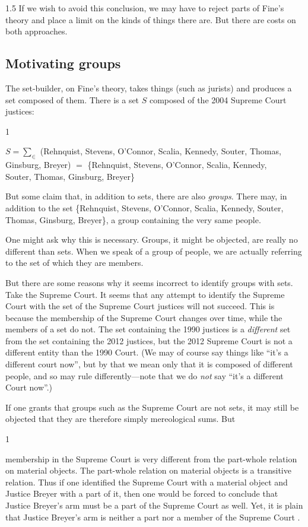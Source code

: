 \documentclass[11pt]{article}
\newenvironment{squote}{%
\begin{spacing}{1}
\begin{list}{}{%
\setlength{\labelwidth}{0pt}%
\rightmargin\leftmargin%
}
\item\relax
}{%
\end{list}%
\end{spacing}
}
\begin{document}
\begin{spacing}{1.5}
If we wish to avoid this conclusion, we may have to reject parts of
Fine's theory and place a limit on the kinds of things there are.  But
there are costs on both approaches.

\subsection{Motivating groups}
The set-builder, on Fine's theory, takes things (such as jurists) and
produces a set composed of them.  There is a set $S$ composed of the
2004 Supreme Court justices:

\begin{squote}
$S = \sum _{\in}$ (Rehnquist, Stevens, O'Connor, Scalia, Kennedy,
  Souter, Thomas, \\ Ginsburg, Breyer) $ = $ \{Rehnquist, Stevens,
  O'Connor, Scalia, Kennedy, \\ Souter, Thomas, Ginsburg, Breyer\}
\end{squote}

But some claim that, in addition to sets, there are also {\em groups}.
There may, in addition to the set \{Rehnquist, Stevens, O'Connor,
Scalia, Kennedy, Souter, Thomas, Ginsburg, Breyer\}, a group
containing the very same people.

One might ask why this is necessary.  Groups, it might be objected,
are really no different than sets.  When we speak of a group of
people, we are actually referring to the set of which they are
members.

But there are some reasons why it seems incorrect to identify groups
with sets.  Take the Supreme Court.  It seems that any attempt to
identify the Supreme Court with the set of the Supreme Court justices
will not succeed.  This is because the membership of the Supreme Court
changes over time, while the members of a set do not.  The set
containing the 1990 justices is a {\em different} set from the set
containing the 2012 justices, but the 2012 Supreme Court is not a
different entity than the 1990 Court.  (We may of course say things
like ``it's a different court now'', but by that we mean only that it
is composed of different people, and so may rule differently---note
that we do {\em not} say ``it's a different Court now''.)

If one grants that groups such as the Supreme Court are not sets, it
may still be objected that they are therefore simply mereological
sums.  But 

\begin{squote}
membership in the Supreme Court is very different from
the part-whole relation on material objects.  The part-whole relation
on material objects is a transitive relation.  Thus if one identified
the Supreme Court with a material object and Justice Breyer with a
part of it, then one would be forced to conclude that Justice Breyer's
arm must be a part of the Supreme Court as well.  Yet, it is plain
that Justice Breyer's arm is neither a part nor a member of the
Supreme Court \citep[136--137]{uzquiano2004a}.
\end{squote}


\end{spacing}
\end{document}
